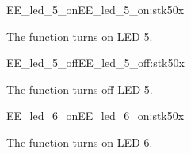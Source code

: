 \begin{function_nopb2}{EE\_led\_5\_on}{EE_led_5_on:stk50x}
  
  \begin{fundescription}
    The function turns on LED 5.
  \end{fundescription}
  
  
  
\end{function_nopb2}

\begin{function_nopb2}{EE\_led\_5\_off}{EE_led_5_off:stk50x}
  
  \begin{fundescription}
    The function turns off LED 5.
  \end{fundescription}
  
  
  
\end{function_nopb2}

\begin{function_nopb2}{EE\_led\_6\_on}{EE_led_6_on:stk50x}
  
  \begin{fundescription}
    The function turns on LED 6.
  \end{fundescription}
  
  
  
\end{function_nopb2}

